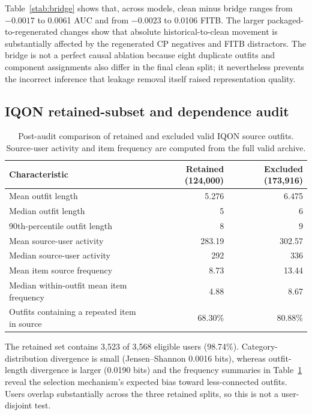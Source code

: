 \documentclass[pdflatex,sn-mathphys-num,iicol]{sn-jnl}
\begin{document}
Table~\ref{stab:bridge} shows that, across models, clean minus bridge ranges from $-0.0017$ to 0.0061 AUC and from $-0.0023$ to 0.0106 FITB. The larger packaged-to-regenerated changes show that absolute historical-to-clean movement is substantially affected by the regenerated CP negatives and FITB distractors. The bridge is not a perfect causal ablation because eight duplicate outfits and component assignments also differ in the final clean split; it nevertheless prevents the incorrect inference that leakage removal itself raised representation quality.

\subsection{IQON retained-subset and dependence audit}

\begin{table}[t]
\caption{Post-audit comparison of retained and excluded valid IQON source outfits. Source-user activity and item frequency are computed from the full valid archive.}
\label{stab:iqonselection}
\centering\small
\begin{tabular}{lrr}
\toprule
Characteristic & Retained (124,000) & Excluded (173,916) \\
\midrule
Mean outfit length & 5.276 & 6.475 \\
Median outfit length & 5 & 6 \\
90th-percentile outfit length & 8 & 9 \\
Mean source-user activity & 283.19 & 302.57 \\
Median source-user activity & 292 & 336 \\
Mean item source frequency & 8.73 & 13.44 \\
Median within-outfit mean item frequency & 4.88 & 8.67 \\
Outfits containing a repeated item in source & 68.30\% & 80.88\% \\
\bottomrule
\end{tabular}
\end{table}

The retained set contains 3,523 of 3,568 eligible users (98.74\%). Category-distribution divergence is small (Jensen--Shannon 0.0016 bits), whereas outfit-length divergence is larger (0.0190 bits) and the frequency summaries in Table~\ref{stab:iqonselection} reveal the selection mechanism's expected bias toward less-connected outfits. Users overlap substantially across the three retained splits, so this is not a user-disjoint test.
\end{document}
